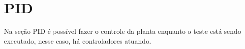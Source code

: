 
\chapter{PID}%
\label{chapter:PID}

Na seção PID é possível fazer o controle da planta enquanto o teste
está sendo executado, nesse caso, há controladores atuando.


